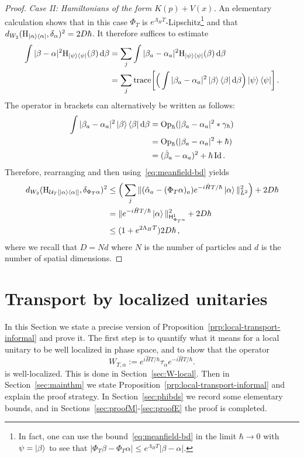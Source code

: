 \documentclass[11pt]{amsart}
\def\Husimi{{\mathrm{H}}}
\def\Sobolev{{\mathsf{H}}}
\def\Op{\mathrm{Op}}
\def\trace{\operatorname*{trace}}
\def\Id{\mathrm{Id}}
\newcommand{\diff}{\mathop{}\!\mathrm{d}}
\newcommand{\mcal}[1]{{\mathcal{#1}}}
\def\bra#1{\mathinner{\langle{#1}|}}
\def\ket#1{\mathinner{|{#1}\rangle}}
\numberwithin{equation}{section}
\begin{document}
\begin{proof}
\textit{Case II: Hamiltonians of the form $K(p)+V(x)$.}
An elementary calculation shows that in this case $\Phi_T$ is $e^{\Lambda_H T}$-Lipschitz\footnote{In fact, one can use the bound~\eqref{eq:meanfield-bd} in the limit $\hbar\to 0$ with $\psi = \ket{\beta}$ to see that $|\Phi_T \beta-\Phi_T \alpha| \leq e^{\Lambda_HT}|\beta-\alpha|$.} and that $d_{W_2}(\Husimi_{\ket{\alpha}\bra{\alpha}}, \delta_\alpha)^2 = 2D\hbar$.
It therefore suffices to estimate
\begin{align*}
\int |\beta-\alpha|^2\Husimi_{\ket{\psi}\bra{\psi}}(\beta)\diff \beta
&=
\sum_j
\int |\beta_a-\alpha_a|^2\Husimi_{\ket{\psi}\bra{\psi}}(\beta)\diff \beta \\
&=
\sum_j
\trace\!\left[ \Big(\int |\beta_a-\alpha_a|^2\ket{\beta}\bra{\beta}\diff \beta\Big)\ket{\psi}\bra{\psi}\right].
\end{align*}
The operator in brackets can alternatively be written as follows:
\begin{align*}
\int |\beta_a-\alpha_a|^2\ket{\beta}\bra{\beta}\diff \beta
&= \Op_\hbar( |\beta_a-\alpha_a|^2 \ast \gamma_\hbar) \\
&= \Op_\hbar(|\beta_a-\alpha_a|^2 +  \hbar) \\
&= (\hat{\beta}_a - \alpha_a)^2 + \hbar\,\Id\,.
\end{align*}
Therefore, rearranging and then using~\eqref{eq:meanfield-bd} yields
\begin{align*}
d_{W_2} (\Husimi_{\mcal{U}_T[\ket{\alpha}\bra{\alpha}]}, \delta_{\Phi_T\alpha})^2
&\leq \Big(\sum_j \|(\hat{\alpha}_a - (\Phi_T\alpha)_a) e^{-i\hat{H}T/\hbar}\ket{\alpha}\|_{L^2}^2 \Big)
+ 2D \hbar \\
&= \|e^{-i\hat{H}T/\hbar} \ket{\alpha}\|_{\Sobolev^1_{\Phi_T\alpha}}^2 + 2D\hbar \\
&\leq (1 + e^{2\Lambda_H T}) 2D\hbar\,,
\end{align*}
where we recall that $D = N d$ where $N$ is the number of particles and $d$ is the number of spatial dimensions.
\end{proof}



\section{Transport by localized unitaries}
\label{sec:W-transport}

In this Section we state a precise version of Proposition~\ref{prp:local-transport-informal} and prove it.
The first step is to quantify what it means for a local unitary to be well localized in phase space,
and to show that the operator
\begin{equation}
\label{eq:Wshift-def}
W_{T,\alpha} := e^{i\hat{H}T/\hbar} \tau_\alpha e^{-i\hat{H}T/\hbar}.
\end{equation}
is well-localized.  This is done in Section~\ref{sec:W-local}.  Then in Section~\ref{sec:mainthm} we state
Proposition~\ref{prp:local-transport-informal} and explain the proof strategy.  In Section~\ref{sec:phibds} we record some
elementary bounds, and in Sections~\ref{sec:proofM}-\ref{sec:proofE} the proof is completed.
\end{document}
